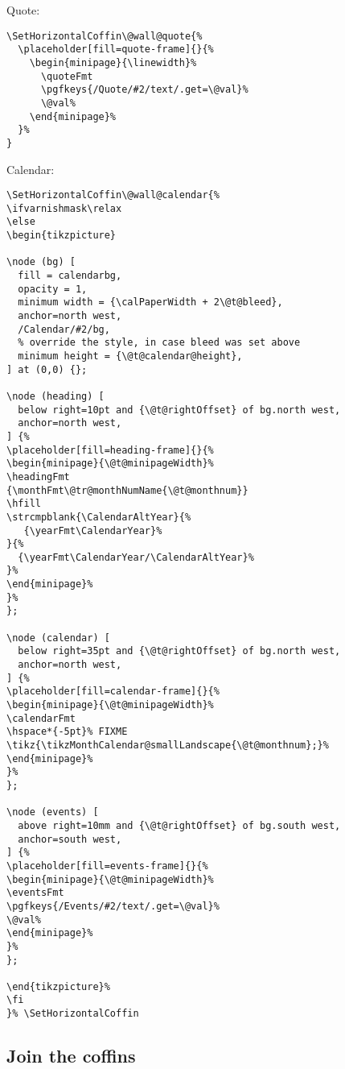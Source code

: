 \documentclass[11pt,oneside]{memoir-article}
\begin{document}
Quote:

\begin{verbatim}
\SetHorizontalCoffin\@wall@quote{%
  \placeholder[fill=quote-frame]{}{%
    \begin{minipage}{\linewidth}%
      \quoteFmt
      \pgfkeys{/Quote/#2/text/.get=\@val}%
      \@val%
    \end{minipage}%
  }%
}
\end{verbatim}

Calendar:

\begin{verbatim}
\SetHorizontalCoffin\@wall@calendar{%
\ifvarnishmask\relax
\else
\begin{tikzpicture}

\node (bg) [
  fill = calendarbg,
  opacity = 1,
  minimum width = {\calPaperWidth + 2\@t@bleed},
  anchor=north west,
  /Calendar/#2/bg,
  % override the style, in case bleed was set above
  minimum height = {\@t@calendar@height},
] at (0,0) {};

\node (heading) [
  below right=10pt and {\@t@rightOffset} of bg.north west,
  anchor=north west,
] {%
\placeholder[fill=heading-frame]{}{%
\begin{minipage}{\@t@minipageWidth}%
\headingFmt
{\monthFmt\@tr@monthNumName{\@t@monthnum}}
\hfill
\strcmpblank{\CalendarAltYear}{%
   {\yearFmt\CalendarYear}%
}{%
  {\yearFmt\CalendarYear/\CalendarAltYear}%
}%
\end{minipage}%
}%
};

\node (calendar) [
  below right=35pt and {\@t@rightOffset} of bg.north west,
  anchor=north west,
] {%
\placeholder[fill=calendar-frame]{}{%
\begin{minipage}{\@t@minipageWidth}%
\calendarFmt
\hspace*{-5pt}% FIXME
\tikz{\tikzMonthCalendar@smallLandscape{\@t@monthnum};}%
\end{minipage}%
}%
};

\node (events) [
  above right=10mm and {\@t@rightOffset} of bg.south west,
  anchor=south west,
] {%
\placeholder[fill=events-frame]{}{%
\begin{minipage}{\@t@minipageWidth}%
\eventsFmt
\pgfkeys{/Events/#2/text/.get=\@val}%
\@val%
\end{minipage}%
}%
};

\end{tikzpicture}%
\fi
}% \SetHorizontalCoffin
\end{verbatim}

\subsection{Join the coffins}
\label{sec:orga14d3db}
\end{document}
